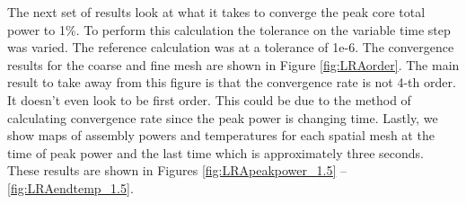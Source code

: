 \documentclass{ansconf}
\numberwithin{equation}{section}
\begin{document}
The next set of results look at what it takes to converge the peak core total power to 1\%. To perform this calculation the tolerance on the variable time step was varied. The reference calculation was at a tolerance of 1e-6. The convergence results for the coarse and fine mesh are shown in Figure \ref{fig:LRAorder}. The main result to take away from this figure is that the convergence rate is not 4-th order. It doesn't even look to be first order. This could be due to the method of calculating convergence rate since the peak power is changing time. Lastly, we show maps of assembly powers and temperatures for each spatial mesh at the time of peak power and the last time which is approximately three seconds. These results are shown in Figures \ref{fig:LRApeakpower_1.5} -- \ref{fig:LRAendtemp_1.5}.










\setlength{\baselineskip}{12pt}




\appendix\newpage
\end{document}
